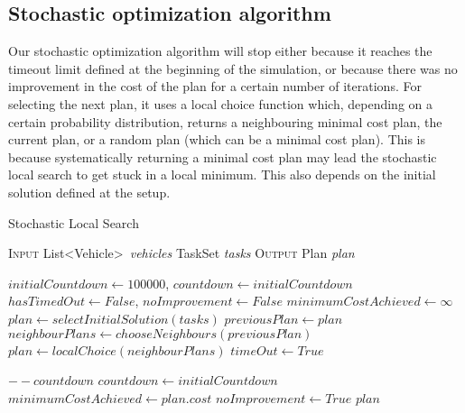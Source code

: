 \documentclass[10pt]{article}
\begin{document}
\subsection{Stochastic optimization algorithm}

Our stochastic optimization algorithm will stop either because it reaches the timeout limit defined at the beginning of the simulation, or because there was no improvement in the cost of the plan for a certain number of iterations.
For selecting the next plan, it uses a local choice function which, depending on a certain probability distribution, returns a neighbouring minimal cost plan, the current plan, or a random plan (which can be a minimal cost plan). This is because systematically returning a minimal cost plan may lead the stochastic local search to get stuck in a local minimum. This also depends on the initial solution defined at the setup.

\begin{algorithm}[h]
\caption{Stochastic Local Search}
\begin{algorithmic}[0]
\Statex \textsc{Input}
\Statex \hspace{\algorithmicindent} List\textless Vehicle\textgreater\ \textit{vehicles} 
\Statex \hspace{\algorithmicindent} TaskSet \textit{tasks} 
\Statex \textsc{Output}
\Statex \hspace{\algorithmicindent} Plan \textit{plan} 

\State	
\State $initialCountdown \gets 100 000$, $countdown \gets initialCountdown$
\State $hasTimedOut \gets False$, $noImprovement \gets False$
\State $minimumCostAchieved \gets  \infty$
\State $plan \gets  selectInitialSolution(tasks)$
\State
{}
\State $previousPlan \gets plan$
\State $neighbourPlans \gets chooseNeighbours(previousPlan)$
\State $plan \gets localChoice(neighbourPlans)$
\State
{} 
	\State $timeOut \gets True$
\EndIf

	\State $--countdown$
\Else
	\State $countdown \gets initialCountdown$
	\State $minimumCostAchieved \gets plan.cost$
\EndIf
{}
	\State $noImprovement \gets True$
\EndIf
\EndWhile
\State \Return $plan$
\end{algorithmic}
\end{algorithm}
\end{document}
